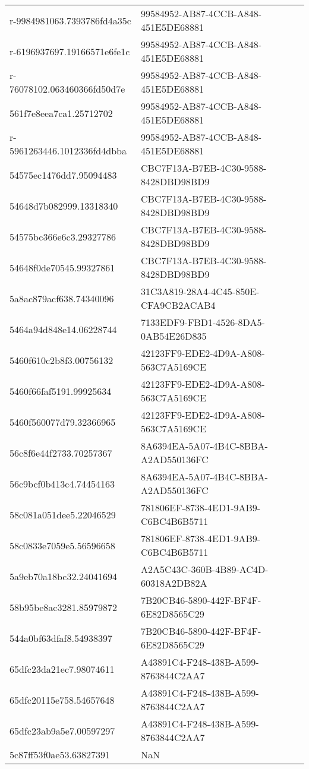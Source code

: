 \begin{tabular}{ll}
r-9984981063.7393786fd4a35c & 99584952-AB87-4CCB-A848-451E5DE68881 \\
r-6196937697.19166571e6fe1c & 99584952-AB87-4CCB-A848-451E5DE68881 \\
r-76078102.063460366fd50d7e & 99584952-AB87-4CCB-A848-451E5DE68881 \\
561f7e8eea7ca1.25712702 & 99584952-AB87-4CCB-A848-451E5DE68881 \\
r-5961263446.1012336fd4dbba & 99584952-AB87-4CCB-A848-451E5DE68881 \\
54575ec1476dd7.95094483 & CBC7F13A-B7EB-4C30-9588-8428DBD98BD9 \\
54648d7b082999.13318340 & CBC7F13A-B7EB-4C30-9588-8428DBD98BD9 \\
54575bc366e6c3.29327786 & CBC7F13A-B7EB-4C30-9588-8428DBD98BD9 \\
54648f0de70545.99327861 & CBC7F13A-B7EB-4C30-9588-8428DBD98BD9 \\
5a8ac879acf638.74340096 & 31C3A819-28A4-4C45-850E-CFA9CB2ACAB4 \\
5464a94d848e14.06228744 & 7133EDF9-FBD1-4526-8DA5-0AB54E26D835 \\
5460f610c2b8f3.00756132 & 42123FF9-EDE2-4D9A-A808-563C7A5169CE \\
5460f66faf5191.99925634 & 42123FF9-EDE2-4D9A-A808-563C7A5169CE \\
5460f560077d79.32366965 & 42123FF9-EDE2-4D9A-A808-563C7A5169CE \\
56c8f6e44f2733.70257367 & 8A6394EA-5A07-4B4C-8BBA-A2AD550136FC \\
56c9bcf0b413c4.74454163 & 8A6394EA-5A07-4B4C-8BBA-A2AD550136FC \\
58c081a051dee5.22046529 & 781806EF-8738-4ED1-9AB9-C6BC4B6B5711 \\
58c0833e7059e5.56596658 & 781806EF-8738-4ED1-9AB9-C6BC4B6B5711 \\
5a9eb70a18bc32.24041694 & A2A5C43C-360B-4B89-AC4D-60318A2DB82A \\
58b95be8ac3281.85979872 & 7B20CB46-5890-442F-BF4F-6E82D8565C29 \\
544a0bf63dfaf8.54938397 & 7B20CB46-5890-442F-BF4F-6E82D8565C29 \\
65dfc23da21ec7.98074611 & A43891C4-F248-438B-A599-8763844C2AA7 \\
65dfc20115e758.54657648 & A43891C4-F248-438B-A599-8763844C2AA7 \\
65dfc23ab9a5e7.00597297 & A43891C4-F248-438B-A599-8763844C2AA7 \\
5c87ff53f0ae53.63827391 & NaN \\

\end{tabular}
